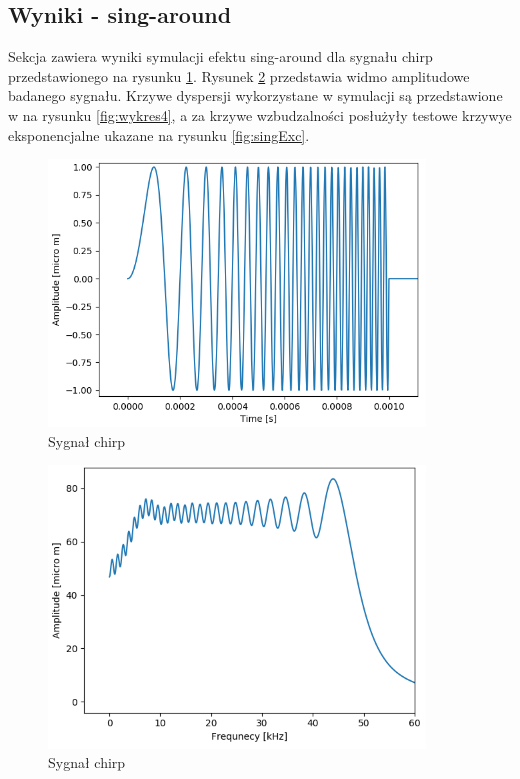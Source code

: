 \subsection{Wyniki - sing-around}
\label{sec:53f}

Sekcja zawiera wyniki symulacji efektu sing-around dla sygnału chirp przedstawionego na rysunku \ref{fig:chirp}. Rysunek \ref{fig:fchirp} przedstawia widmo amplitudowe badanego sygnału. Krzywe dyspersji wykorzystane w symulacji są przedstawione w na rysunku \ref{fig:wykres4}, a za krzywe wzbudzalności posłużyły testowe krzywye eksponencjalne ukazane na rysunku \ref{fig:singExc}.

\begin{figure}[h]
\centering
\includegraphics[width=10cm]{Zdjecia/5/chirp1}
\caption{Sygnał chirp}
\label{fig:chirp}
\end{figure}

\begin{figure}[h]
\centering
\includegraphics[width=10cm]{Zdjecia/5/chirp_widmo}
\caption{Sygnał chirp}
\label{fig:fchirp}
\end{figure}

